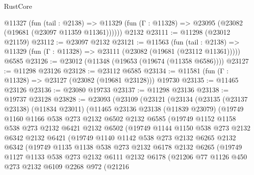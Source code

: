 \begin{lexlean}{RustCore}
\begin{coremodule}
    @11327
      (fun (tail : @2138) =>
      @11329 (fun (Γ : @11328) => @23095 (@23082 (@19681 (@23097 @11359 @11361))))))
    @2132
@23111 := @11298 (@23012 @21159)
@23112 := @23097 @2132
@23121 := @11563
    (fun (tail : @2138) => @11329 (fun (Γ : @11328) => @23111 (@23082 (@19681 (@23112 @11361)))))
    @6585
@23126 := @23012 (@11348 (@19653 (@19674 (@11358 @6586))))
@23127 := @11298 @23126
@23128 := @23112 @6585
@23134 := @11581 (fun (Γ : @11328) => @23127 (@23082 (@19681 @23128))) @19730
@23135 := @11465 @23126
@23136 := @23080 @19733
@23137 := @11298 @23136
@23138 := @19737 @23128
@23828 := @23093
    (@23109
      (@23121
        (@23134
          (@23135
            (@23137 @23138)
            (@11834 @23011)
            (@11465
              @23136
              @23138
              (@11839 @23079)
              (@19749
                @1160
                @1166
                @538
                @273
                @2132
                @6502
                @2132
                @6585
                (@19749
                  @1152
                  @1158
                  @538
                  @273
                  @2132
                  @6421
                  @2132
                  @6502
                  (@19749
                    @1144
                    @1150
                    @538
                    @273
                    @2132
                    @6342
                    @2132
                    @6421
                    (@19749
                      @1140
                      @1142
                      @538
                      @273
                      @2132
                      @6265
                      @2132
                      @6342
                      (@19749
                        @1135
                        @1138
                        @538
                        @273
                        @2132
                        @6178
                        @2132
                        @6265
                        (@19749
                          @1127
                          @1133
                          @538
                          @273
                          @2132
                          @6111
                          @2132
                          @6178
                          (@21206
                            @77
                            @1126
                            @450
                            @273
                            @2132
                            @6109
                            @2268
                            @972
                            (@21216

\end{coremodule}
\end{lexlean}
